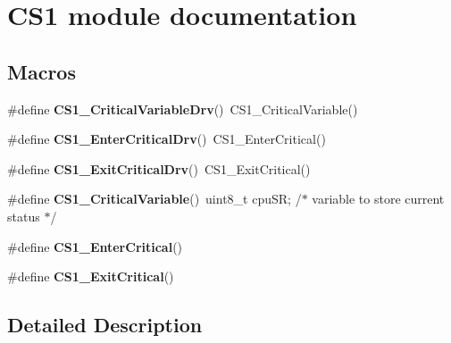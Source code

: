 \hypertarget{group___c_s1__module}{\section{C\-S1 module documentation}
\label{group___c_s1__module}
}
\subsection*{Macros}
\begin{DoxyCompactItemize}
\item 
\hypertarget{group___c_s1__module_gaee7f03127014fe509003f75c2c1f0dc0}{\#define {\bfseries C\-S1\-\_\-\-Critical\-Variable\-Drv}()~C\-S1\-\_\-\-Critical\-Variable()}\label{group___c_s1__module_gaee7f03127014fe509003f75c2c1f0dc0}

\item 
\hypertarget{group___c_s1__module_ga4223c328a86a18fe41809a4efe6a6ceb}{\#define {\bfseries C\-S1\-\_\-\-Enter\-Critical\-Drv}()~C\-S1\-\_\-\-Enter\-Critical()}\label{group___c_s1__module_ga4223c328a86a18fe41809a4efe6a6ceb}

\item 
\hypertarget{group___c_s1__module_ga45fb3d48218d21f7139c9bebc1c4dbc6}{\#define {\bfseries C\-S1\-\_\-\-Exit\-Critical\-Drv}()~C\-S1\-\_\-\-Exit\-Critical()}\label{group___c_s1__module_ga45fb3d48218d21f7139c9bebc1c4dbc6}

\item 
\hypertarget{group___c_s1__module_ga6656bf8cb7badce9ab7876d747423f9a}{\#define {\bfseries C\-S1\-\_\-\-Critical\-Variable}()~uint8\-\_\-t cpu\-S\-R; /$\ast$ variable to store current status $\ast$/}\label{group___c_s1__module_ga6656bf8cb7badce9ab7876d747423f9a}

\item 
\#define {\bfseries C\-S1\-\_\-\-Enter\-Critical}()
\item 
\#define {\bfseries C\-S1\-\_\-\-Exit\-Critical}()
\end{DoxyCompactItemize}


\subsection{Detailed Description}


